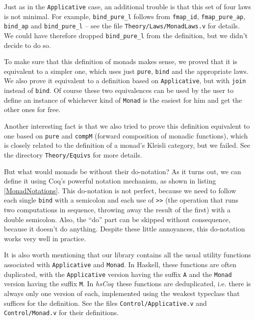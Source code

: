 \documentclass[declaration,inz,english,shortabstract]{iithesis}
\newcommand{\libname}{\textit{hsCoq}}
\newcommand{\m}[1]{\texttt{#1}}
\begin{document}
Just as in the \m{Applicative} case, an additional trouble is that this set of four laws is not minimal. For example, \m{bind\_pure\_l} follows from \m{fmap\_id}, \m{fmap\_pure\_ap}, \m{bind\_ap} and \m{bind\_pure\_l} -- see the file \m{Theory/Laws/MonadLaws.v} for details. We could have therefore dropped \m{bind\_pure\_l} from the definition, but we didn't decide to do so.

To make sure that this definition of monads makes sense, we proved that it is equivalent to a simpler one, which uses just \m{pure}, \m{bind} and the appropriate laws. We also prove it equivalent to a definition based on \m{Applicative}, but with \m{join} instead of \m{bind}. Of course these two equivalences can be used by the user to define an instance of whichever kind of \m{Monad} is the easiest for him and get the other ones for free.

Another interesting fact is that we also tried to prove this definition equivalent to one based on \m{pure} and \m{compM} (forward composition of monadic functions), which is closely related to the definition of a monad's Kleisli category, but we failed. See the directory \m{Theory/Equivs} for more details.


But what would monads be without their do-notation? As it turns out, we can define it using Coq's powerful notation mechanism, as shown in listing \ref{MonadNotations}. This do-notation is not perfect, because we need to follow each single \m{bind} with a semicolon and each use of \m{>>} (the operation that runs two computations in sequence, throwing away the result of the first) with a double semicolon. Also, the ``do'' part can be skipped without consequence, because it doesn't do anything. Despite these little annoyances, this do-notation works very well in practice.

It is also worth mentioning that our library contains all the usual utility functions associated with \m{Applicative} and \m{Monad}. In Haskell, these functions are often duplicated, with the \m{Applicative} version having the suffix \m{A} and the \m{Monad} version having the suffix \m{M}. In \libname\ these functions are deduplicated, i.e. there is always only one version of each, implemented using the weakest typeclass that suffices for the definition. See the files \m{Control/Applicative.v} and \m{Control/Monad.v} for their definitions.
\end{document}
